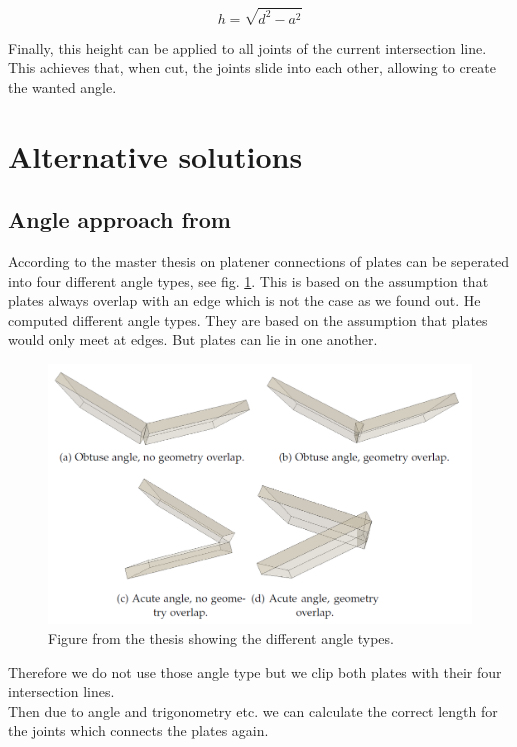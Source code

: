 \documentclass[../ClassicThesis.tex]{subfiles}
\begin{document}
    $$ h = \sqrt{d^2 - a^2} $$
    
    Finally, this height can be applied to all joints of the current intersection line. This achieves that, when cut, the joints slide into each other, allowing to create the wanted angle.
    

\section{Alternative solutions}\label{alternativeSolution}


\subsection{Angle approach from \citeauthor{master-thesis} }
According to the master thesis on platener \cite{master-thesis} connections of plates can be seperated into four different angle types, see fig. \ref{fig:dustinsAngles}. This is based on the assumption that plates always overlap with an edge which is not the case as we found out.
He computed different angle types. They are based on the assumption that plates would only meet at edges. But plates can lie in one another.
\begin{figure}[!ht]
    \centering
    \includegraphics[width=1\columnwidth]{Images/06-1-graph-dustinsAngleImage.png}
    \caption{Figure from the thesis \cite{master-thesis} showing the different angle types.}
    \label{fig:dustinsAngles}
\end{figure}
Therefore we do not use those angle type but we clip both plates with their four intersection lines. \\
Then due to angle and trigonometry etc. we can calculate the correct length for the joints which connects the plates again.
\end{document}
